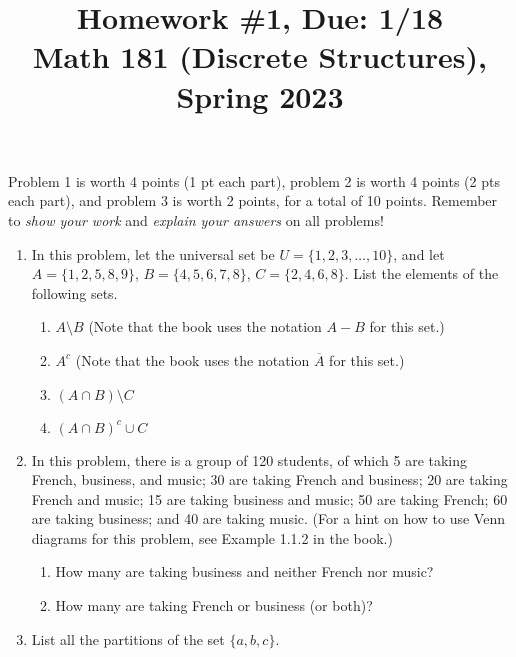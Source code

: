 \documentclass[11pt]{article}
\title{Homework \#1, Due: 1/18 \\Math 181 (Discrete Structures), Spring 2023}
\date{}
\begin{document}
\maketitle

\thispagestyle{empty}

\vspace{-1cm}

Problem 1 is worth 4 points (1 pt each part), problem 2 is worth 4 points (2 pts each part), and problem 3 is worth 2 points, for a total of 10 points. Remember to \emph{show your work} and \emph{explain your answers} on all problems!

\begin{enumerate}
\item In this problem, let the universal set be $U=\{1,2,3,\ldots,10\}$, and let $A=\{1,2,5,8,9\}$, $B=\{4,5,6,7,8\}$,  $C=\{2,4,6,8\}$. List the elements of the following sets.

\begin{enumerate}
\item $A \setminus B$ \hfill (Note that the book uses the notation $A-B$ for this set.)
\item $A^c$ \hfill (Note that the book uses the notation $\overline{A}$ for this set.)
\item $(A\cap B) \setminus C$
\item $(A \cap B)^c \cup C$
\end{enumerate}

\item In this problem, there is a group of 120 students, of which 5 are taking French, business, and music; 30 are taking French and business; 20 are taking French and music; 15 are taking business and music; 50 are taking French; 60 are taking business; and 40 are taking music. (For a hint on how to use Venn diagrams for this problem, see Example 1.1.2 in the book.)

\begin{enumerate}
\item How many are taking business and neither French nor music?
\item How many are taking French or business (or both)?
\end{enumerate}

\item List all the partitions of the set $\{a,b,c\}$.

\end{enumerate}
\end{document}
